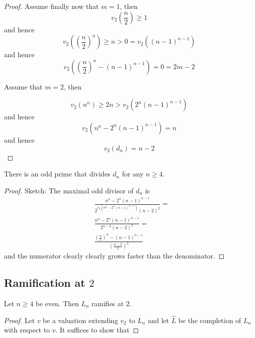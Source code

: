 \documentclass[../main.tex]{subfiles}
\begin{document}
\begin{proof}
  Assume finally now that $m = 1$, then 
  \[
    v_2\left( \frac{n}{2} \right) \geq 1
  \]
  and hence 
  \[
    v_2\left( \left( \frac{n}{2} \right)^n \right) \geq n > 0 = v_2\left( \left( n - 1 \right)^{ n - 1 } \right)
  \]
  and hence 
  \[
    v_2\left( \left( \frac{n}{2} \right)^n - \left( n - 1 \right)^{ n - 1 } \right) = 0 = 2m - 2
  \]
  
  Assume  that $m = 2$, then

  \[
    v_2\left( n^n \right) \geq 2n > v_2\left( 2^n \left(  n - 1 \right)^{ n - 1 } \right)
  \]
  and hence 
  \[
    v_2\left( n^n - 2^n \left( n - 1 \right)^{ n - 1 } \right) = n 
  \]
  and hence 
\[
  v_2\left( d_n \right) = n - 2
\]
\end{proof}

\begin{corollary}
  There is an odd prime that divides \( d_n \) for any \( n \geq 4 \).
\end{corollary}
\begin{proof}
  Sketch: The maximal odd divisor of \( d_n \) is 
  \begin{align*}
    & \frac{
      n^n - 2^n \left( n - 1 \right)^{ n - 1 }
    }{
      2^{v_2\left( n^n - 2^n \left( n - 1 \right)^{ n - 1 } \right)} \left( n - 2 \right)^2
    } = \\
    & \frac{
      n^n - 2^n \left( n - 1 \right)^{ n - 1 }
    }{
      2^{n - 2} \left( n - 2 \right)^2
    } = \\
    & \frac{
      \left( \frac{n}{2} \right)^n - \left( n - 1 \right)^{ n - 1 }
    }{
      \left( \frac{n - 2}{2} \right)^2
    }
  \end{align*}
  and the numerator clearly clearly grows faster than the denominator.
\end{proof}

\subsection{Ramification at $2$}
\begin{lemma}
  Let $n \geq 4$ be even.
  Then $L_n$ ramifies at $2$.
\end{lemma}
\begin{proof}
  Let $v$ be a valuation extending $v_2$ to $L_n$ and let $\widehat{L}$ be the completion of $L_n$ with respect to $v$.
  It suffices to show that 
\end{proof}



  
\end{document}
